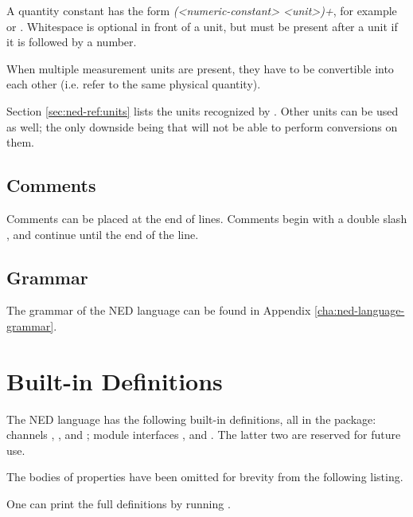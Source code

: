 A quantity constant has the form \textit{(<numeric-constant> <unit>)+}, for
example  or . Whitespace is optional in front
of a unit, but must be present after a unit if it is followed by a number.

When multiple measurement units are present, they have to be convertible
into each other (i.e. refer to the same physical quantity).

Section \ref{sec:ned-ref:units} lists the units recognized by {\opp}.
Other units can be used as well; the only downside being that {\opp} will
not be able to perform conversions on them.


\subsection{Comments}
\label{sec:ned-ref:comments}

Comments can be placed at the end of lines. Comments begin with a double
slash \ttt{//}, and continue until the end of the line.


\subsection{Grammar}
\label{sec:ned-ref:grammar}

The grammar of the NED language can be found in Appendix
\ref{cha:ned-language-grammar}.

\section{Built-in Definitions}
\label{sec:ned-ref:built-in-defs}

The NED language has the following built-in definitions, all in the 
package: channels , , and ;
module interfaces , and .
The latter two are reserved for future use.

The bodies of  properties have been omitted for brevity from
the following listing.

\begin{note}
One can print the full definitions by running .
\end{note}

